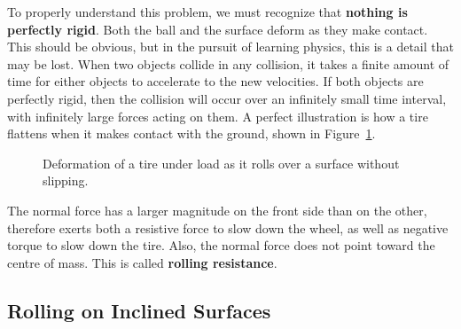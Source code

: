 To properly understand this problem, we must recognize that \textbf{nothing is
  perfectly rigid}. Both the ball and the surface deform as they make contact.
This should be obvious, but in the pursuit of learning physics, this is a detail
that may be lost. When two objects collide in any collision, it takes a finite
amount of time for either objects to accelerate to the new velocities. If both
objects are perfectly rigid, then the collision will occur over an infinitely
small time interval, with infinitely large forces acting on them. A perfect
illustration is how a tire flattens when it makes contact with the ground,
shown in Figure~\ref{tire1}.
\begin{figure}[!ht]
  \centering
  \caption{Deformation of a tire under load as it rolls over a surface
    without slipping.}
  \label{tire1}
\end{figure}

The normal force has a larger magnitude on the front side than on the other,
therefore exerts both a resistive force to slow down the wheel, as well as
negative torque to slow down the tire. Also, the normal force does not point
toward the centre of mass. This is called \textbf{rolling resistance}.



\subsection{Rolling on Inclined Surfaces}

